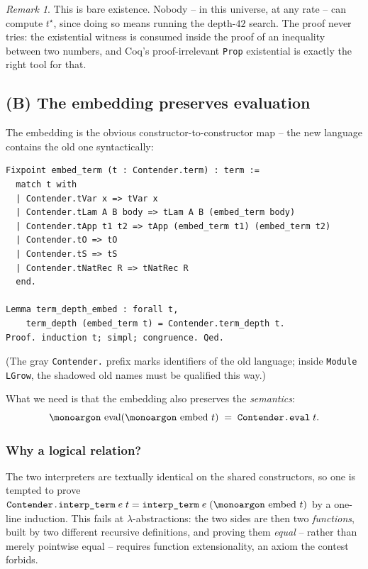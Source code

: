 \documentclass[11pt,a4paper]{article}
\theoremstyle{plain}
\theoremstyle{definition}
\theoremstyle{remark}
\newtheorem{remark}[theorem]{Remark}
\newcommand{\opname}[1]{\mathop{\text{\monoargon #1}}\nolimits}
\newcommand{\eval}{\opname{eval}}
\newcommand{\embed}{\opname{embed}}
\begin{document}
\begin{remark}
This is bare existence.  Nobody -- in this universe, at any rate --
can compute $t^\star$, since doing so means running the depth-$42$
search.  The proof never tries: the existential witness is consumed
inside the proof of an inequality between two numbers, and Coq's
proof-irrelevant \texttt{Prop} existential is exactly the right tool
for that.
\end{remark}

\subsection{(B) The embedding preserves evaluation}
\label{sec:embedding}

The embedding is the obvious constructor-to-constructor map -- the
new language contains the old one syntactically:

\begin{lstlisting}
Fixpoint embed_term (t : Contender.term) : term :=
  match t with
  | Contender.tVar x => tVar x
  | Contender.tLam A B body => tLam A B (embed_term body)
  | Contender.tApp t1 t2 => tApp (embed_term t1) (embed_term t2)
  | Contender.tO => tO
  | Contender.tS => tS
  | Contender.tNatRec R => tNatRec R
  end.

Lemma term_depth_embed : forall t,
    term_depth (embed_term t) = Contender.term_depth t.
Proof. induction t; simpl; congruence. Qed.
\end{lstlisting}

(The gray \texttt{Contender.} prefix marks identifiers of the old
language; inside \texttt{Module LGrow}, the shadowed old names must be
qualified this way.)

What we need is that the embedding also preserves the \emph{semantics}:
\[
  \eval(\embed\,t) \;=\; \texttt{Contender.eval}\;t .
\]

\subsubsection{Why a logical relation?}

The two interpreters are textually identical on the shared
constructors, so one is tempted to prove
$\texttt{Contender.interp\_term}\;e\;t = \texttt{interp\_term}\;e\;(\embed\,t)$
by a one-line induction.  This fails at $\lambda$-abstractions: the
two sides are then two \emph{functions}, built by two different
recursive definitions, and proving them \emph{equal} -- rather than
merely pointwise equal -- requires function extensionality, an axiom
the contest forbids.
\end{document}
